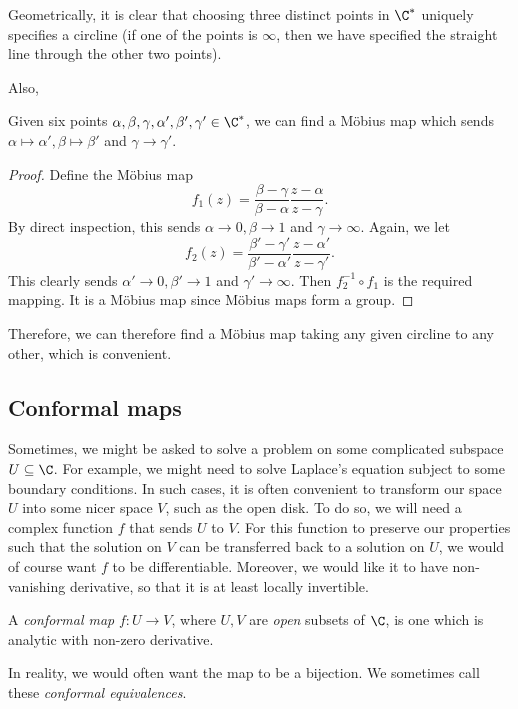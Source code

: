 \documentclass[a4paper]{article}
\begin{document}
Geometrically, it is clear that choosing three distinct points in $\C^*$ uniquely specifies a circline (if one of the points is $\infty$, then we have specified the straight line through the other two points).

Also,
\begin{prop}
  Given six points $\alpha, \beta, \gamma, \alpha', \beta', \gamma' \in \C^*$, we can find a M\"obius map which sends $\alpha \mapsto \alpha', \beta \mapsto \beta'$ and $\gamma \to \gamma'$.
\end{prop}

\begin{proof}
  Define the M\"obius map
  \[
    f_1(z) = \frac{\beta - \gamma}{\beta - \alpha} \frac{z - \alpha}{z - \gamma}.
  \]
  By direct inspection, this sends $\alpha \to 0, \beta \to 1$ and $\gamma \to \infty$. Again, we let
  \[
    f_2(z) = \frac{\beta' - \gamma'}{\beta' - \alpha'} \frac{z - \alpha'}{z - \gamma'}.
  \]
  This clearly sends $\alpha' \to 0, \beta' \to 1$ and $\gamma' \to \infty$. Then $f_2^{-1} \circ f_1$ is the required mapping. It is a M\"obius map since M\"obius maps form a group.
\end{proof}

Therefore, we can therefore find a M\"obius map taking any given circline to any other, which is convenient.

\subsection{Conformal maps}
Sometimes, we might be asked to solve a problem on some complicated subspace $U \subseteq \C$. For example, we might need to solve Laplace's equation subject to some boundary conditions. In such cases, it is often convenient to transform our space $U$ into some nicer space $V$, such as the open disk. To do so, we will need a complex function $f$ that sends $U$ to $V$. For this function to preserve our properties such that the solution on $V$ can be transferred back to a solution on $U$, we would of course want $f$ to be differentiable. Moreover, we would like it to have non-vanishing derivative, so that it is at least locally invertible.

\begin{defi}
  A \emph{conformal map} $f: U \to V$, where $U, V$ are \emph{open} subsets of $\C$, is one which is analytic with non-zero derivative.
\end{defi}
In reality, we would often want the map to be a bijection. We sometimes call these \emph{conformal equivalences}.
\end{document}
